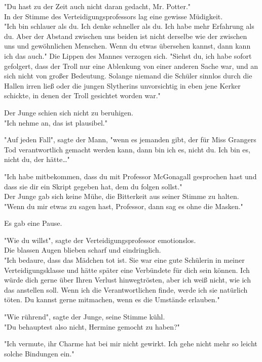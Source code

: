 {"Du hast zu der Zeit auch nicht daran gedacht, Mr. Potter."\\ In der Stimme des Verteidigungsprofessors lag eine gewisse Müdigkeit.\\ "Ich bin schlauer als du. Ich denke schneller als du. Ich habe mehr Erfahrung als du. Aber der Abstand zwischen uns beiden ist nicht derselbe wie der zwischen uns und gewöhnlichen Menschen. Wenn du etwas übersehen kannst, dann kann ich das auch." Die Lippen des Mannes verzogen sich. "Siehst du, ich habe sofort gefolgert, dass der Troll nur eine Ablenkung von einer anderen Sache war, und an sich nicht von großer Bedeutung. Solange niemand die Schüler sinnlos durch die Hallen irren ließ oder die jungen Slytherins unvorsichtig in eben jene Kerker schickte, in denen der Troll gesichtet worden war."

Der Junge schien sich nicht zu beruhigen.\\ "Ich nehme an, das ist plausibel."

"Auf jeden Fall", sagte der Mann, "wenn es jemanden gibt, der für Miss Grangers Tod verantwortlich gemacht werden kann, dann bin ich es, nicht du. Ich bin es, nicht du, der hätte…"

"Ich habe mitbekommen, dass du mit Professor McGonagall gesprochen hast und dass sie dir ein Skript gegeben hat, dem du folgen sollst."\\ Der Junge gab sich keine Mühe, die Bitterkeit aus seiner Stimme zu halten.\\ "Wenn du mir etwas zu sagen hast, Professor, dann sag es ohne die Masken."

Es gab eine Pause.

"Wie du willst", sagte der Verteidigungsprofessor emotionslos.\\ Die blassen Augen blieben scharf und eindringlich.\\ "Ich bedaure, dass das Mädchen tot ist. Sie war eine gute Schülerin in meiner Verteidigungsklasse und hätte später eine Verbündete für dich sein können. Ich würde dich gerne über Ihren Verlust hinwegtrösten, aber ich weiß nicht, wie ich das anstellen soll. Wenn ich die Verantwortlichen finde, werde ich sie natürlich töten. Du kannst gerne mitmachen, wenn es die Umstände erlauben."

"Wie rührend", sagte der Junge, seine Stimme kühl.\\ "Du behauptest also nicht, Hermine gemocht zu haben?"

"Ich vermute, ihr Charme hat bei mir nicht gewirkt. Ich gehe nicht mehr so leicht solche Bindungen ein."

}

